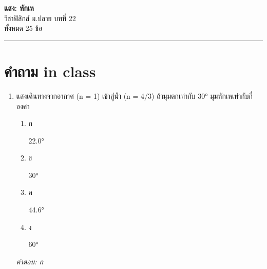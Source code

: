 \documentclass[12pt]{article}
\begin{document}
\begin{center}
{\Large\textbf{แสง: หักเห}}\\[6pt]
{\normalsize วิชาฟิสิกส์ ม.ปลาย บทที่ 22}\\[4pt]
{\footnotesize ทั้งหมด 25 ข้อ}
\end{center}
\hrule
\bigskip

\section*{คำถาม in class}
\begin{enumerate}[label=\arabic*., itemsep=0.5\baselineskip, topsep=0.5\baselineskip, leftmargin=*]
\item แสงเดินทางจากอากาศ (n = 1) เข้าสู่น้ำ (n = 4/3) ถ้ามุมตกเท่ากับ 30° มุมหักเหเท่ากับกี่องศา
\begin{enumerate}[label=\alph*)., itemsep=0.3\baselineskip, topsep=0.3\baselineskip]
\item ก\ 
\begin{minipage}[t]{0.9\linewidth}
\raggedright 22.0°
\end{minipage}
\item ข\ 
\begin{minipage}[t]{0.9\linewidth}
\raggedright 30°
\end{minipage}
\item ค\ 
\begin{minipage}[t]{0.9\linewidth}
\raggedright 44.6°
\end{minipage}
\item ง\ 
\begin{minipage}[t]{0.9\linewidth}
\raggedright 60°
\end{minipage}
\end{enumerate}
\vspace{-0.3\baselineskip}
\begin{small}
\textit{คำตอบ: ก}
\end{small}


\end{enumerate}
\end{document}
